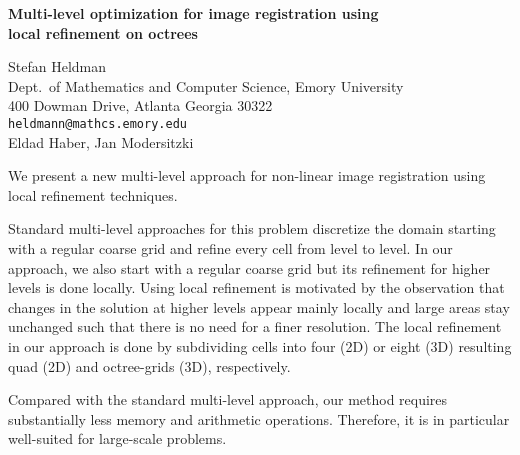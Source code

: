 \documentclass{report}
\begin{document}

\begin{center}
{\large
{\bf Multi-level optimization for image registration using \\
	local refinement on octrees}}

	Stefan Heldman \\
	Dept.~of Mathematics and Computer Science, Emory University \\
	400 Dowman Drive, Atlanta Georgia 30322 \\
	{\tt heldmann@mathcs.emory.edu}
	\\ Eldad Haber, Jan Modersitzki
\end{center}
We present a new multi-level approach for non-linear image
registration using local refinement techniques.

Standard multi-level approaches for this problem discretize
the domain starting with a regular coarse grid and refine
every cell from level to level. In our approach, we also
start with a regular coarse grid but its refinement for
higher levels is done locally. Using local refinement is
motivated by the observation that changes in the solution at
higher levels appear mainly locally and large areas stay
unchanged such that there is no need for a finer resolution.
The local refinement in our approach is done by subdividing
cells into four (2D) or eight (3D) resulting quad (2D) and
octree-grids (3D), respectively.

Compared with the standard multi-level approach, our method
requires substantially less memory and arithmetic
operations. Therefore, it is in particular well-suited for
large-scale problems.



\end{document}
